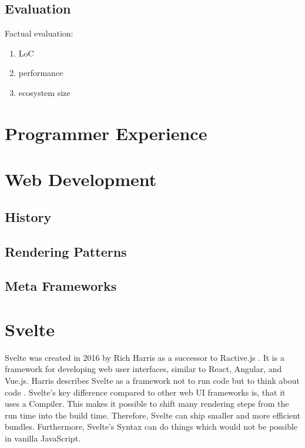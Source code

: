 \subsection{Evaluation}

Factual evaluation:
\begin{enumerate}
    \item LoC
    \item performance
    \item ecosystem size
\end{enumerate}

\section{Programmer Experience}


\section{Web Development}
\label{sec:web-development}

\subsection{History}

\subsection{Rendering Patterns}

\subsection{Meta Frameworks}

\section{Svelte}
\label{sec:svelte}

% 
% 
% 
% 

Svelte was created in 2016 by Rich Harris as a successor to Ractive.js \cite{offerzen_origins_svelte_2022}. It is a framework for developing web user interfaces, similar to React, Angular, and Vue.js. Harris describes Svelte as a framework not to run code but to think about code \cite{offerzen_origins_svelte_2022}. Svelte's key difference compared to other web UI frameworks is, that it uses a Compiler. This makes it possible to shift many rendering steps from the run time into the build time. Therefore, Svelte can ship smaller and more efficient bundles. Furthermore, Svelte's Syntax can do things which would not be possible in vanilla JavaScript.


